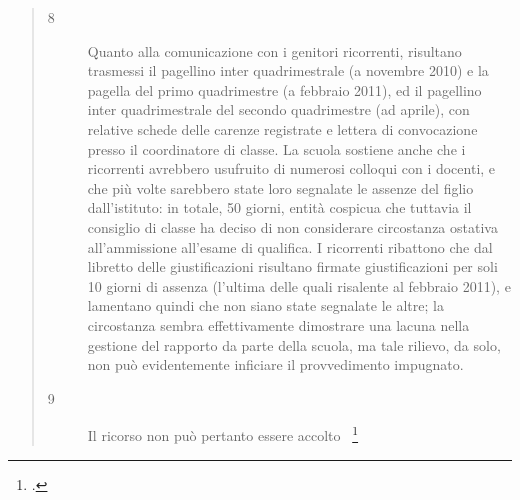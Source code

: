 \begin{quote}
\begin{description}
\item [8] Quanto alla comunicazione con i genitori ricorrenti, risultano trasmessi il pagellino inter quadrimestrale (a novembre 2010) e la pagella del primo quadrimestre (a febbraio 2011), ed il pagellino inter quadrimestrale del secondo quadrimestre (ad aprile), con relative schede delle carenze registrate e lettera di convocazione presso il coordinatore di classe. La scuola sostiene anche che i ricorrenti avrebbero usufruito di numerosi colloqui con i docenti, e che più volte sarebbero state loro segnalate le assenze del figlio dall'istituto: in totale, 50 giorni, entità cospicua che tuttavia il consiglio di classe ha deciso di non considerare circostanza ostativa all'ammissione all'esame di qualifica. I ricorrenti ribattono che dal libretto delle giustificazioni risultano firmate giustificazioni per soli 10 giorni di assenza (l'ultima delle quali risalente al febbraio 2011), e lamentano quindi che non siano state segnalate le altre; la circostanza sembra effettivamente dimostrare una lacuna nella gestione del rapporto da parte della scuola, ma tale rilievo, da solo, non può evidentemente inficiare il provvedimento impugnato.
\item [9]Il ricorso non può pertanto essere accolto ~\footcite{tarumbria329}
 		 \mancatesto
 	\end{description}
 \end{quote}
 
